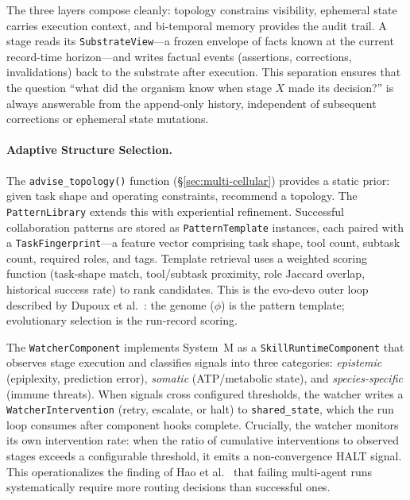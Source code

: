 The three layers compose cleanly: topology constrains visibility, ephemeral state carries execution context, and bi-temporal memory provides the audit trail. A stage reads its \texttt{SubstrateView}---a frozen envelope of facts known at the current record-time horizon---and writes factual events (assertions, corrections, invalidations) back to the substrate after execution. This separation ensures that the question ``what did the organism know when stage $X$ made its decision?'' is always answerable from the append-only history, independent of subsequent corrections or ephemeral state mutations.

\paragraph{Adaptive Structure Selection.}
\label{sec:adaptive-structure}
The \texttt{advise\_topology()} function (\S\ref{sec:multi-cellular}) provides a static prior: given task shape and operating constraints, recommend a topology. The \texttt{PatternLibrary} extends this with experiential refinement. Successful collaboration patterns are stored as \texttt{PatternTemplate} instances, each paired with a \texttt{TaskFingerprint}---a feature vector comprising task shape, tool count, subtask count, required roles, and tags. Template retrieval uses a weighted scoring function (task-shape match, tool/subtask proximity, role Jaccard overlap, historical success rate) to rank candidates. This is the evo-devo outer loop described by Dupoux et al.~\cite{dupoux2026learning}: the genome ($\phi$) is the pattern template; evolutionary selection is the run-record scoring.

The \texttt{WatcherComponent} implements System~M as a \texttt{SkillRuntimeComponent} that observes stage execution and classifies signals into three categories: \emph{epistemic} (epiplexity, prediction error), \emph{somatic} (ATP/metabolic state), and \emph{species-specific} (immune threats). When signals cross configured thresholds, the watcher writes a \texttt{WatcherIntervention} (retry, escalate, or halt) to \texttt{shared\_state}, which the run loop consumes after component hooks complete. Crucially, the watcher monitors its own intervention rate: when the ratio of cumulative interventions to observed stages exceeds a configurable threshold, it emits a non-convergence HALT signal. This operationalizes the finding of Hao et al.~\cite{hao2026bigmas} that failing multi-agent runs systematically require more routing decisions than successful ones.

